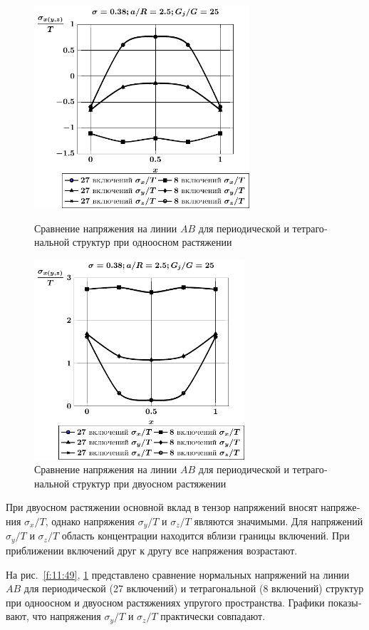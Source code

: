 \begin{russian}
\begin{figure}[ht!]
\centering\footnotesize
\parbox[b]{7.5cm}{\centering\includegraphics[width=8cm]{oblate-inc27-8-a25-g25-t1.pdf}
\caption{Сравнение напряжения на линии $AB$ для периодической и тетрагональной структур при одноосном растяжении
\label{f:11:49}}}\hfil\hfil
\parbox[b]{7.5cm}{\centering\includegraphics[width=7.8cm]{oblate-inc27-8-a25-g25-t2.pdf}
\caption{Сравнение напряжения на линии $AB$ для периодической и тетрагональной структур при двуосном растяжении
\label{f:11:50}}}
\end{figure}

При двуосном растяжении основной вклад в тензор напряжений вносят напряжения $\sigma_x/T$, однако напряжения $\sigma_y/T$ и $\sigma_z/T$ являются значимыми. Для напряжений $\sigma_y/T$ и $\sigma_z/T$ область концентрации находится вблизи границы включений. При приближении включений друг к другу все напряжения возрастают.

На рис.~\ref{f:11:49}, \ref{f:11:50} представлено сравнение нормальных напряжений на линии $AB$ для периодической (27 включений) и тетрагональной (8 включений) структур при одноосном и двуосном растяжениях упругого пространства. Графики показывают, что напряжения $\sigma_y/T$ и $\sigma_z/T$ практически совпадают.

\end{russian}